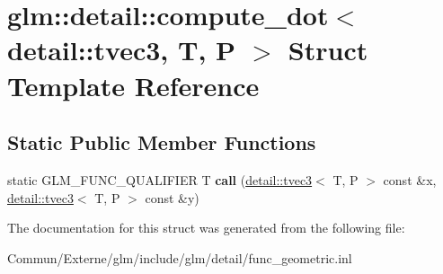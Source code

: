 \hypertarget{structglm_1_1detail_1_1compute__dot_3_01detail_1_1tvec3_00_01_t_00_01_p_01_4}{}\section{glm\+:\+:detail\+:\+:compute\+\_\+dot$<$ detail\+:\+:tvec3, T, P $>$ Struct Template Reference}
\label{structglm_1_1detail_1_1compute__dot_3_01detail_1_1tvec3_00_01_t_00_01_p_01_4}
\subsection*{Static Public Member Functions}
\begin{DoxyCompactItemize}
\item 
static G\+L\+M\+\_\+\+F\+U\+N\+C\+\_\+\+Q\+U\+A\+L\+I\+F\+I\+ER T {\bfseries call} (\hyperlink{structglm_1_1detail_1_1tvec3}{detail\+::tvec3}$<$ T, P $>$ const \&x, \hyperlink{structglm_1_1detail_1_1tvec3}{detail\+::tvec3}$<$ T, P $>$ const \&y)\hypertarget{structglm_1_1detail_1_1compute__dot_3_01detail_1_1tvec3_00_01_t_00_01_p_01_4_a2320996e972e6955b19c23ab96c77626}{}\label{structglm_1_1detail_1_1compute__dot_3_01detail_1_1tvec3_00_01_t_00_01_p_01_4_a2320996e972e6955b19c23ab96c77626}

\end{DoxyCompactItemize}


The documentation for this struct was generated from the following file\+:\begin{DoxyCompactItemize}
\item 
Commun/\+Externe/glm/include/glm/detail/func\+\_\+geometric.\+inl\end{DoxyCompactItemize}
